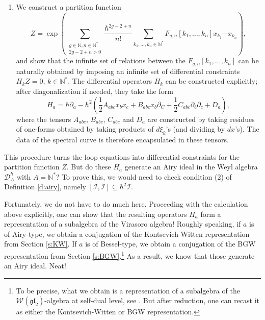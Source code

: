 \documentclass[reqno,oneside,11pt]{amsart}
\theoremstyle{plain}
\theoremstyle{definition}
\theoremstyle{remark}
\numberwithin{equation}{section}
\newcommand{\I}{\mathcal{I}}
\newcommand{\DAh}{\mathcal{D}_A^{\hbar}}
\begin{document}
\begin{enumerate}
\item We construct  a partition function
\begin{equation}
Z = \exp\left( \sum_{\substack{g \in  \mathbb{N}, n \in \mathbb{N}^* \\ 2g-2+n > 0}} \frac{\hbar^{2g-2+n}}{n!}  \sum_{k_1, \ldots, k_n \in \mathbb{N}^*}  F_{g,n}[k_1, \ldots,k_n]  x_{k_1} \cdots x_{k_n}\right),
\end{equation}
and show that the infinite set of relations between the $F_{g,n}[k_1,\ldots,k_n]$ can be naturally obtained by imposing an infinite set of differential constraints $H_k Z = 0$, $k \in \mathbb{N}^*$. The differential operators $H_k$ can be constructed explicitly; after diagonalization if needed, they take the form
\begin{equation}
H_a = \hbar \partial_a -\hbar^2 \left(  \frac{1}{2} A_{abc} x_b x_c + B_{abc} x_b \partial_C + \frac{1}{2}C_{abc} \partial_b \partial_c + D_a \right),
\end{equation}
where the tensors $A_{abc}$, $B_{abc}$, $C_{abc}$ and $D_a$ are constructed by taking residues of one-forms obtained by taking products of $d \xi_k$'s (and dividing by $dx$'s). The data of the spectral curve is therefore encapsulated in these tensors.
\end{enumerate}

This procedure turns the loop equations into differential constraints for the partition function $Z$. But do these $H_a$ generate an Airy ideal in the Weyl algebra $\DAh$ with $A = \mathbb{N}^*$? To prove this, we would need to check condition (2) of Definition \ref{d:airy}, namely $[\I,\I] \subseteq \hbar^2 \I$.

Fortunately, we do not have to do much here. Proceeding with the calculation above explicitly, one can show that the resulting operators $H_a$ form a representation of a subalgebra of the Virasoro algebra! Roughly speaking, if $a$ is of Airy-type, we obtain a conjugation of the Kontsevich-Witten representation from Section \ref{s:KW}. If $a$ is of Bessel-type, we obtain a conjugation of the BGW representation from Section \ref{s:BGW}.\footnote{To be precise, what we obtain is a representation of a subalgebra of the $\mathcal{W}(\mathfrak{gl}_2)$-algebra at self-dual level, see \cite{BBCCN18}. But after reduction, one can recast it as either the Kontsevich-Witten or BGW representation.} As a result, we know that those generate an Airy ideal. Neat!
\end{document}
